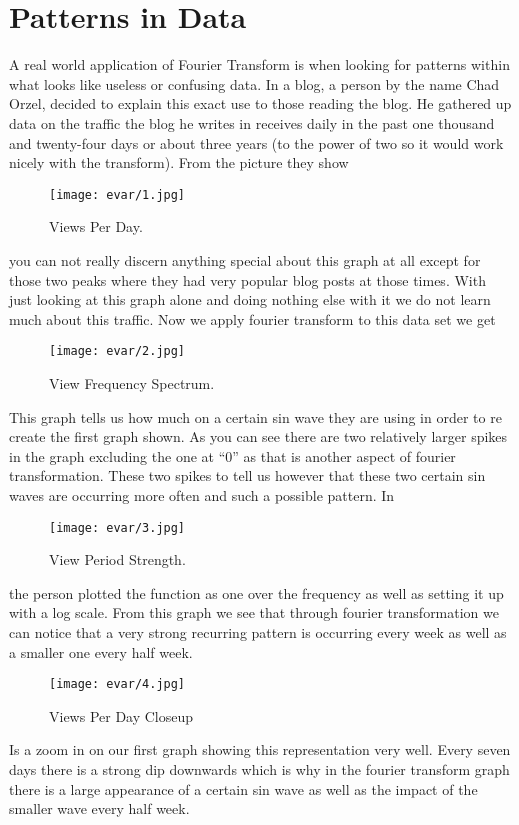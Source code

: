 \documentclass [../article.tex]{subfiles}
\begin{document}
  \section{Patterns in Data}
  A real world application of Fourier Transform is when
  looking for patterns within what looks like useless or
  confusing data. In a blog, a person by the name Chad
  Orzel, decided to explain this exact use to those
  reading the blog. He gathered up data on the traffic the
  blog he writes in receives daily in the past one thousand
  and twenty-four days or about three years (to the power of
  two so it would work nicely with the transform).
  From the picture they show
  \begin{figure}[H]
    \texttt{[image: evar/1.jpg]}
    \caption{Views Per Day.}
    \label{fig:views}
  \end{figure}
  you can not really discern anything special about this graph
  at all except for those two peaks where they had very popular
  blog posts at those times. With just looking at this graph
  alone and doing nothing else with it we do not learn much
  about this traffic. Now we apply fourier transform to this
  data set we get
  \begin{figure}[H]
    \texttt{[image: evar/2.jpg]}
    \caption{View Frequency Spectrum.}
    \label{fig:viewfreq}
  \end{figure}
  This graph tells us how much on a certain sin wave they are
  using in order to re create the first graph shown. As you can
  see there are two relatively larger spikes in the graph
  excluding the one at “0” as that is another aspect of fourier
  transformation. These two spikes to tell us however that these
  two certain sin waves are occurring more often and such a
  possible pattern. In
  \begin{figure}[H]
    \texttt{[image: evar/3.jpg]}
    \caption{View Period Strength.}
    \label{fig:viewperiods}
  \end{figure}
  the person plotted the function as one over the frequency as
  well as setting it up with a log scale. From this graph we see
  that through  fourier transformation we can notice that a very
  strong recurring pattern is occurring every week as well as a
  smaller one every half week.
  \begin{figure}[H]
    \texttt{[image: evar/4.jpg]}
    \caption{Views Per Day Closeup}
    \label{fig:viewcloseup}
  \end{figure}
  Is a zoom in on our first graph showing this representation very
  well. Every seven days there is a strong dip downwards  which is
  why in the fourier transform graph there is a large appearance of
  a certain sin wave as well as the impact of the smaller wave every
  half week.
\end{document}
